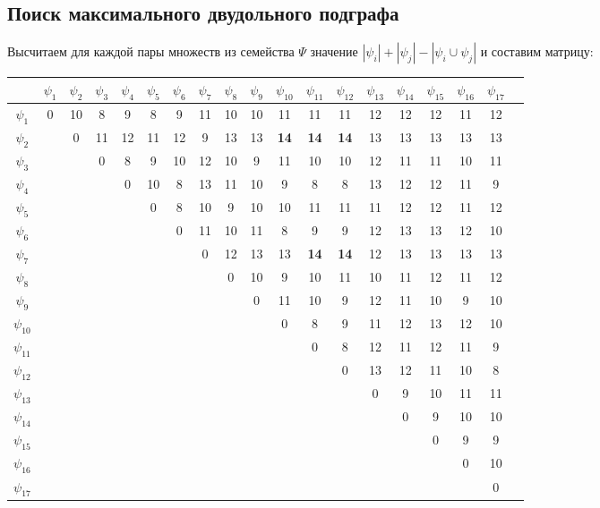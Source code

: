 \documentclass[12pt, a4paper] {ncc}
\begin{document}
\subsection{Поиск максимального двудольного подграфа}

Высчитаем для каждой пары множеств из семейства $\Psi$ значение $|\psi_i| +
|\psi_j| - |\psi_i \cup \psi_j|$ и составим матрицу:

\begin{tabular}{c|c c c c c c c c c c c c c c c c c c}
\hline
& $\psi_1$ & $\psi_2$ & $\psi_3$ & $\psi_4$ & $\psi_5$ & $\psi_6$ & $\psi_7$ & $\psi_8$ & $\psi_9$ & $\psi_{10}$ & $\psi_{11}$ & $\psi_{12}$ & $\psi_{13}$ & $\psi_{14}$ & $\psi_{15}$ & $\psi_{16}$ & $\psi_{17}$\\ \hline
	$\psi_{1} $  & 0 &10&8 &9 &8 &9 &11&10&10&11&11&11&12&12&12&11&12 \\
	$\psi_{2} $  &   & 0&11&12&11&12&9 &13&13&\textbf{14}&\textbf{14}&\textbf{14}&13&13&13&13&13 \\
	$\psi_{3} $  &   &  & 0&8 &9 &10&12&10&9 &11&10&10&12&11&11&10&11 \\
	$\psi_{4} $  &   &  &  & 0&10&8 &13&11&10&9 &8 &8 &13&12&12&11&9  \\
	$\psi_{5} $  &   &  &  &  & 0&8 &10&9 &10&10&11&11&11&12&12&11&12 \\
	$\psi_{6} $  &   &  &  &  &  & 0&11&10&11&8 &9 &9 &12&13&13&12&10 \\
	$\psi_{7} $  &   &  &  &  &  &  &0 &12&13&13&\textbf{14}&\textbf{14}&12&13&13&13&13 \\
	$\psi_{8} $  &   &  &  &  &  &  &  & 0&10&9 &10&11&10&11&12&11&12 \\
	$\psi_{9} $  &   &  &  &  &  &  &  &  & 0&11&10&9 &12&11&10&9 &10 \\
	$\psi_{10} $ &   &  &  &  &  &  &  &  &  & 0&8 &9 &11&12&13&12&10 \\
	$\psi_{11} $ &   &  &  &  &  &  &  &  &  &  & 0&8 &12&11&12&11&9  \\
	$\psi_{12} $ &   &  &  &  &  &  &  &  &  &  &  & 0&13&12&11&10&8  \\
	$\psi_{13} $ &   &  &  &  &  &  &  &  &  &  &  &  & 0&9 &10&11&11 \\
	$\psi_{14} $ &   &  &  &  &  &  &  &  &  &  &  &  &  & 0&9 &10&10 \\
	$\psi_{15} $ &   &  &  &  &  &  &  &  &  &  &  &  &  &  & 0&9 &9  \\
	$\psi_{16} $ &   &  &  &  &  &  &  &  &  &  &  &  &  &  &  & 0&10 \\
	$\psi_{17} $ &   &  &  &  &  &  &  &  &  &  &  &  &  &  &  &  &0  \\
\end{tabular}
\end{document}
